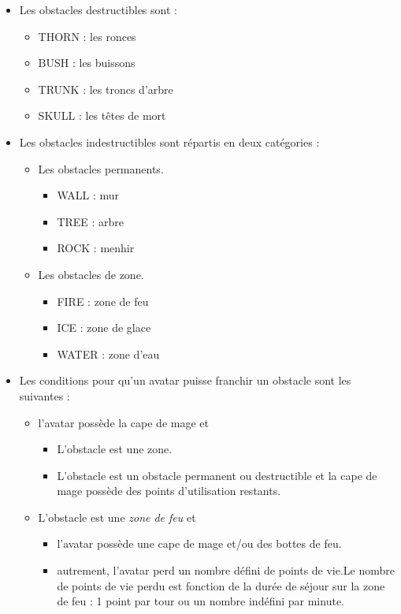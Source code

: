 \begin{itemize}
    \item Les obstacles destructibles sont :
        \begin{itemize}
          \item THORN : les ronces
          \item BUSH :  les buissons
          \item TRUNK : les troncs d'arbre
          \item SKULL : les têtes de mort
        \end{itemize}
    \item Les obstacles indestructibles sont répartis en deux catégories :
        \begin{itemize}
            \item Les obstacles permanents.
                \begin{itemize}
                    \item WALL : mur
                    \item TREE : arbre
                    \item ROCK : menhir
                \end{itemize}
            \item Les obstacles de zone.
                \begin{itemize}
                    \item FIRE : zone de feu
                    \item ICE : zone de glace
                    \item WATER : zone d'eau
                \end{itemize}
        \end{itemize}
    \item Les conditions pour qu'un avatar puisse franchir un obstacle sont les suivantes :
        \begin{itemize}
            \item l'avatar possède la cape de mage et 
                \begin{itemize}
                    \item L'obstacle est une zone.
                    \item L'obstacle est un obstacle permanent ou destructible et la cape de mage possède des points d'utilisation restants.
                \end{itemize}
            \item L'obstacle est une \textit{zone de feu} et
                \begin{itemize}
                    \item l'avatar possède une cape de mage et/ou des bottes de feu.
                    \item autrement, l'avatar perd un nombre défini de points de vie.\newline Le nombre de points de vie perdu est fonction de la durée de séjour sur la zone de feu : 1 point par tour ou un nombre indéfini par minute.
                \end{itemize}
            

\end{itemize}
\end{itemize}
